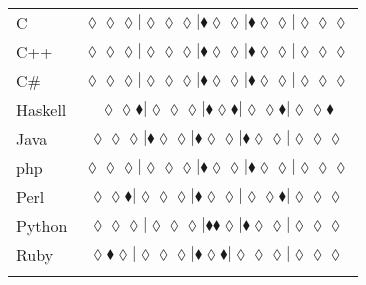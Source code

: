 \begin{table*}
{\begin{tabular}{l c}
C & $\scriptscriptstyle\lozenge\lozenge\lozenge|\lozenge\lozenge\lozenge|\blacklozenge\lozenge\lozenge|\blacklozenge\lozenge\lozenge|\lozenge\lozenge\lozenge$ \\
C++ & $\scriptscriptstyle\lozenge\lozenge\lozenge|\lozenge\lozenge\lozenge|\blacklozenge\lozenge\lozenge|\blacklozenge\lozenge\lozenge|\lozenge\lozenge\lozenge$ \\
C\# & $\scriptscriptstyle\lozenge\lozenge\lozenge|\lozenge\lozenge\lozenge|\blacklozenge\lozenge\lozenge|\blacklozenge\lozenge\lozenge|\lozenge\lozenge\lozenge$ \\
Haskell & $\scriptscriptstyle\lozenge\lozenge\blacklozenge|\lozenge\lozenge\lozenge|\blacklozenge\lozenge\blacklozenge|\lozenge\lozenge\blacklozenge|\lozenge\lozenge\blacklozenge$ \\
Java & $\scriptscriptstyle\lozenge\lozenge\lozenge|\blacklozenge\lozenge\lozenge|\blacklozenge\lozenge\lozenge|\blacklozenge\lozenge\lozenge|\lozenge\lozenge\lozenge$ \\
{\sc php} & $\scriptscriptstyle\lozenge\lozenge\lozenge|\lozenge\lozenge\lozenge|\blacklozenge\lozenge\lozenge|\blacklozenge\lozenge\lozenge|\lozenge\lozenge\lozenge$ \\
Perl & $\scriptscriptstyle\lozenge\lozenge\blacklozenge|\lozenge\lozenge\lozenge|\blacklozenge\lozenge\lozenge|\lozenge\lozenge\blacklozenge|\lozenge\lozenge\lozenge$ \\
Python & $\scriptscriptstyle\lozenge\lozenge\lozenge|\lozenge\lozenge\lozenge|\blacklozenge\blacklozenge\lozenge|\blacklozenge\lozenge\lozenge|\lozenge\lozenge\lozenge$ \\
Ruby & $\scriptscriptstyle\lozenge\blacklozenge\lozenge|\lozenge\lozenge\lozenge|\blacklozenge\lozenge\blacklozenge|\lozenge\lozenge\lozenge|\lozenge\lozenge\lozenge$ \\

\hline
& \\
\end{tabular}
} 
\end{table*}
